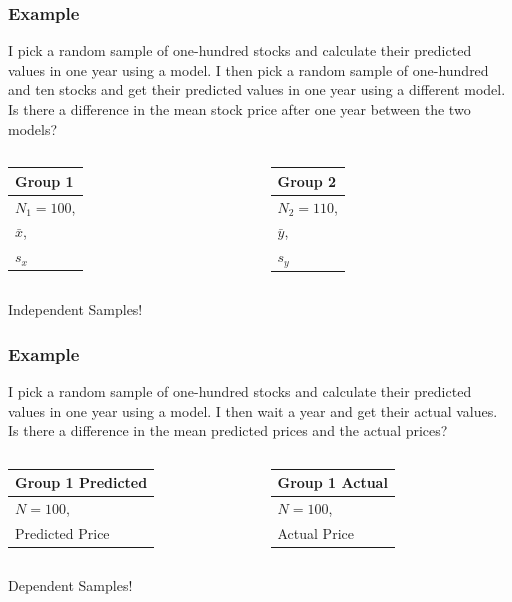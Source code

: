 \begin{frame}
  \frametitle{Example}

  I pick a random sample of one-hundred stocks and calculate their
  predicted values in one year using a model. I then pick a random
  sample of one-hundred and ten stocks and get their predicted values
  in one year using a different model. Is there a difference in the
  mean stock price after one year between the two models?

  {
    \begin{columns}
      \begin{tabular}{l}
        Group 1 \\ \hline
        $N_1=100$, \\
        $\bar{x}$, \\
        $s_x$
      \end{tabular}

      \begin{tabular}{l}
        Group 2 \\ \hline
        $N_2=110$, \\
        $\bar{y}$, \\
        $s_y$
      \end{tabular}

    \end{columns}
  }

  {
    Independent Samples!
  }

  \hfill

\end{frame}


\begin{frame}
  \frametitle{Example}

  I pick a random sample of one-hundred stocks and calculate their
  predicted values in one year using a model. I then wait a year and
  get their actual values. Is there a difference in the mean predicted
  prices and the actual prices?

  {
    \begin{columns}
      \begin{tabular}{l}
        Group 1 Predicted \\ \hline
        $N=100$, \\
        Predicted Price
      \end{tabular}

      \begin{tabular}{l}
        Group 1 Actual \\ \hline
        $N=100$, \\
        Actual Price
      \end{tabular}

    \end{columns}
  }

  {
    Dependent Samples!
  }

  \hfill

\end{frame}



